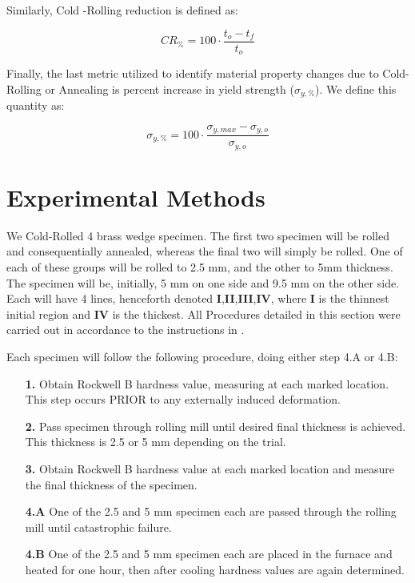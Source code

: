 \documentclass{article}
\begin{document}
Similarly, Cold -Rolling reduction is defined as:

\begin{equation}
    CR_{\%} = 100 \cdot \frac{t_o - t_f}{t_o}
    \label{CRdef}
\end{equation}

Finally, the last metric utilized to identify material property changes due to Cold-Rolling or Annealing is percent increase in yield strength ($\sigma_{y,\%}$). We define this quantity as:

\begin{equation}
    \sigma_{y,\%} = 100 \cdot \frac{\sigma_{y,max} - \sigma_{y,o}}{\sigma_{y,o}} 
    \label{percentyield}
\end{equation}

\newpage
\section{Experimental Methods}

We Cold-Rolled 4 brass wedge specimen. The first two specimen will be rolled and consequentially annealed, whereas the final two will simply be rolled. One of each of these groups will be rolled to 2.5 mm, and the other to 5mm thickness. The specimen will be, initially, 5 mm on one side and 9.5 mm on the other side. Each will have 4 lines, henceforth denoted \textbf{I},\textbf{II},\textbf{III},\textbf{IV}, where \textbf{I} is the thinnest initial region and \textbf{IV} is the thickest. All Procedures  detailed in this section were carried out in accordance to the instructions in \cite{manual}.

Each specimen will follow the following procedure, doing either step 4.A or 4.B:
\begin{itemize}[leftmargin=.75in]
    \item[\textbf{1.}] Obtain Rockwell B hardness value, measuring at each marked location. This step occurs PRIOR to any externally induced deformation.
    \item[\textbf{2.}] Pass specimen through rolling mill until desired final thickness is achieved. This thickness is 2.5 or 5 mm depending on the trial. 
    \item[\textbf{3.}] Obtain Rockwell B hardness value at each marked location and measure the final thickness of the specimen.
    \item[\textbf{4.A}] One of the 2.5 and 5 mm specimen each are passed through the rolling mill until catastrophic failure. 
    \item[\textbf{4.B}] One of the 2.5 and 5 mm specimen each are placed in the furnace and heated for one hour, then after cooling hardness values are again determined.
\end{itemize}
\end{document}
